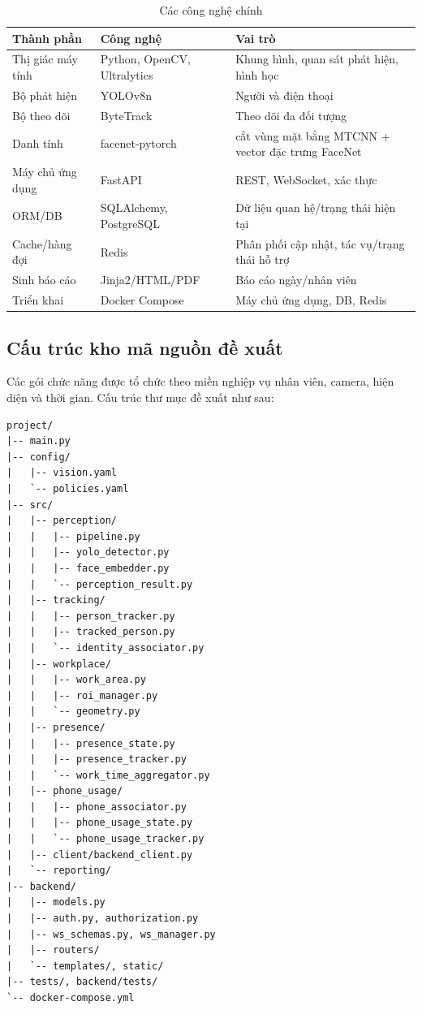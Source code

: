 \begin{table}[H]
\centering
\caption{Các công nghệ chính}
\label{tab:tech-stack}
\begin{tabularx}{\textwidth}{p{3.4cm}p{4.2cm}X}
\toprule
\textbf{Thành phần} & \textbf{Công nghệ} & \textbf{Vai trò}\\
\midrule
Thị giác máy tính & Python, OpenCV, Ultralytics & Khung hình, quan sát phát hiện, hình học\\
Bộ phát hiện & YOLOv8n & Người và điện thoại\\
Bộ theo dõi & ByteTrack & Theo dõi đa đối tượng\\
Danh tính & facenet-pytorch & cắt vùng mặt bằng MTCNN + vector đặc trưng FaceNet\\
Máy chủ ứng dụng & FastAPI & REST, WebSocket, xác thực\\
ORM/DB & SQLAlchemy, PostgreSQL & Dữ liệu quan hệ/trạng thái hiện tại\\
Cache/hàng đợi & Redis & Phân phối cập nhật, tác vụ/trạng thái hỗ trợ\\
Sinh báo cáo & Jinja2/HTML/PDF & Báo cáo ngày/nhân viên\\
Triển khai & Docker Compose & Máy chủ ứng dụng, DB, Redis\\
\bottomrule
\end{tabularx}
\end{table}

\subsection{Cấu trúc kho mã nguồn đề xuất}
Các gói chức năng được tổ chức theo miền nghiệp vụ nhân viên, camera, hiện diện và thời gian. Cấu trúc thư mục đề xuất như sau:
\begin{Verbatim}[fontsize=\small,breaklines=true,breakanywhere=true]
project/
|-- main.py
|-- config/
|   |-- vision.yaml
|   `-- policies.yaml
|-- src/
|   |-- perception/
|   |   |-- pipeline.py
|   |   |-- yolo_detector.py
|   |   |-- face_embedder.py
|   |   `-- perception_result.py
|   |-- tracking/
|   |   |-- person_tracker.py
|   |   |-- tracked_person.py
|   |   `-- identity_associator.py
|   |-- workplace/
|   |   |-- work_area.py
|   |   |-- roi_manager.py
|   |   `-- geometry.py
|   |-- presence/
|   |   |-- presence_state.py
|   |   |-- presence_tracker.py
|   |   `-- work_time_aggregator.py
|   |-- phone_usage/
|   |   |-- phone_associator.py
|   |   |-- phone_usage_state.py
|   |   `-- phone_usage_tracker.py
|   |-- client/backend_client.py
|   `-- reporting/
|-- backend/
|   |-- models.py
|   |-- auth.py, authorization.py
|   |-- ws_schemas.py, ws_manager.py
|   |-- routers/
|   `-- templates/, static/
|-- tests/, backend/tests/
`-- docker-compose.yml
\end{Verbatim}

